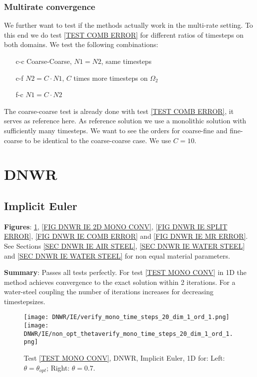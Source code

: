 \documentclass[a4paper,10pt]{article}
\begin{document}
\subsubsection{Multirate convergence}\label{TEST MR}
% 
We further want to test if the methods actually work in the multi-rate setting. To this end we do test \ref{TEST COMB ERROR} for different ratios of timesteps on both domains. We test the following combinations:
% 
\begin{itemize}
\item[c-c] Coarse-Coarse, $N1 = N2$, same timesteps
\item[c-f] $N2 = C \cdot N1$, $C$ times more timesteps on $\Omega_2$
\item[f-c] $N1 = C \cdot N2$
\end{itemize}
% 
The coarse-coarse test is already done with test \ref{TEST COMB ERROR}, it serves as reference here. As reference solution we use a monolithic solution with sufficiently many timesteps. We want to see the orders for coarse-fine and fine-coarse to be identical to the coarse-coarse case. We use $C = 10$.
% 
\FloatBarrier
\section{DNWR}\label{SEC DNWR}
%
\subsection{Implicit Euler}\label{SEC DWNR IE}
% 
\textbf{Figures}: \ref{FIG DNWR IE 1D MONO CONV}, \ref{FIG DNWR IE 2D MONO CONV}, \ref{FIG DNWR IE SPLIT ERROR}, \ref{FIG DNWR IE COMB ERROR} and \ref{FIG DNWR IE MR ERROR}. See Sections \ref{SEC DNWR IE AIR STEEL}, \ref{SEC DNWR IE WATER STEEL} and \ref{SEC DNWR IE WATER STEEL} for non equal material parameters.

\textbf{Summary}: Passes all tests perfectly. For test \ref{TEST MONO CONV} in 1D the method achieves convergence to the exact solution within 2 iterations. For a water-steel coupling the number of iterations increases for decreasing timestepsizes.
% 
\begin{figure}[!ht]
\texttt{[image: DNWR/IE/verify\_mono\_time\_steps\_20\_dim\_1\_ord\_1.png]}
\texttt{[image: DNWR/IE/non\_opt\_thetaverify\_mono\_time\_steps\_20\_dim\_1\_ord\_1.png]}
\caption{Test \ref{TEST MONO CONV}, DNWR, Implicit Euler, 1D for: Left: $\theta = \theta_{opt}$; Right: $\theta = 0.7$.}
\label{FIG DNWR IE 1D MONO CONV}
\end{figure}
\end{document}
